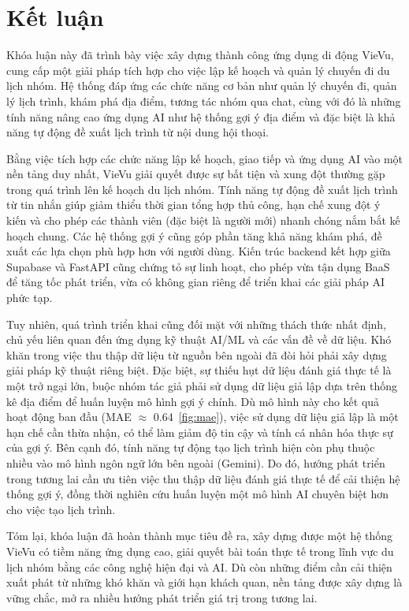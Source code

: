 \chapter*{Kết luận}
\noindent Khóa luận này đã trình bày việc xây dựng thành công ứng dụng di động VieVu, cung cấp một giải pháp tích hợp cho việc lập kế hoạch và quản lý chuyến đi du lịch nhóm. Hệ thống đáp ứng các chức năng cơ bản như quản lý chuyến đi, quản lý lịch trình, khám phá địa điểm, tương tác nhóm qua chat, cùng với đó là những tính năng nâng cao ứng dụng AI như hệ thống gợi ý địa điểm và đặc biệt là khả năng tự động đề xuất lịch trình từ nội dung hội thoại.

Bằng việc tích hợp các chức năng lập kế hoạch, giao tiếp và ứng dụng AI vào một nền tảng duy nhất, VieVu giải quyết được sự bất tiện và xung đột thường gặp trong quá trình lên kế hoạch du lịch nhóm. Tính năng tự động đề xuất lịch trình từ tin nhắn giúp giảm thiểu thời gian tổng hợp thủ công, hạn chế xung đột ý kiến và cho phép các thành viên (đặc biệt là người mới) nhanh chóng nắm bắt kế hoạch chung. Các hệ thống gợi ý cũng góp phần tăng khả năng khám phá, đề xuất các lựa chọn phù hợp hơn với người dùng. Kiến trúc backend kết hợp giữa Supabase và FastAPI cũng chứng tỏ sự linh hoạt, cho phép vừa tận dụng BaaS để tăng tốc phát triển, vừa có không gian riêng để triển khai các giải pháp AI phức tạp.

Tuy nhiên, quá trình triển khai cũng đối mặt với những thách thức nhất định, chủ yếu liên quan đến ứng dụng kỹ thuật AI/ML và các vấn đề về dữ liệu. Khó khăn trong việc thu thập dữ liệu từ nguồn bên ngoài đã đòi hỏi phải xây dựng giải pháp kỹ thuật riêng biệt. Đặc biệt, sự thiếu hụt dữ liệu đánh giá thực tế là một trở ngại lớn, buộc nhóm tác giả phải sử dụng dữ liệu giả lập dựa trên thống kê địa điểm để huấn luyện mô hình gợi ý chính. Dù mô hình này cho kết quả hoạt động ban đầu (MAE $\approx$ 0.64~\ref{fig:mae}), %
việc sử dụng dữ liệu giả lập là một hạn chế cần thừa nhận, có thể làm giảm độ tin cậy và tính cá nhân hóa thực sự của gợi ý. Bên cạnh đó, tính năng tự động tạo lịch trình hiện còn phụ thuộc nhiều vào mô hình ngôn ngữ lớn bên ngoài (Gemini). Do đó, hướng phát triển trong tương lai cần ưu tiên việc thu thập dữ liệu đánh giá thực tế để cải thiện hệ thống gợi ý, đồng thời nghiên cứu huấn luyện một mô hình AI chuyên biệt hơn cho việc tạo lịch trình.

Tóm lại, khóa luận đã hoàn thành mục tiêu đề ra, xây dựng được một hệ thống VieVu có tiềm năng ứng dụng cao, giải quyết bài toán thực tế trong lĩnh vực du lịch nhóm bằng các công nghệ hiện đại và AI. Dù còn những điểm cần cải thiện xuất phát từ những khó khăn và giới hạn khách quan, nền tảng được xây dựng là vững chắc, mở ra nhiều hướng phát triển giá trị trong tương lai.